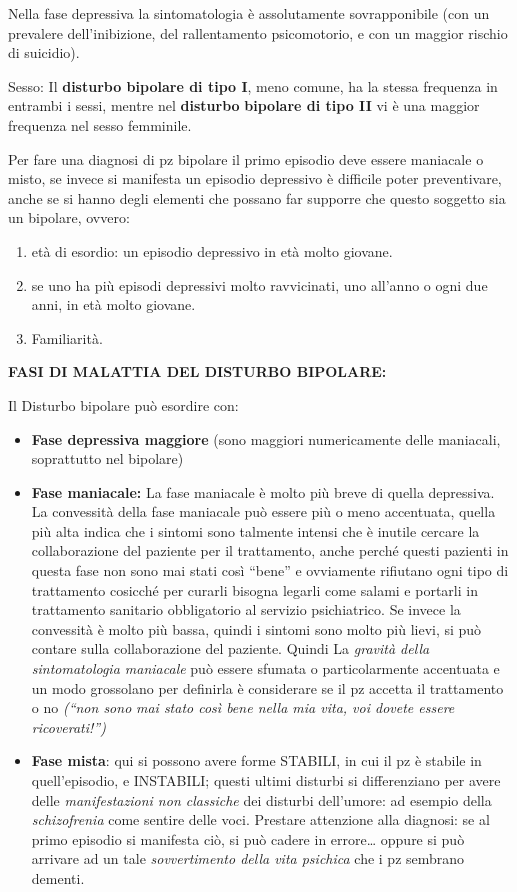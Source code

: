 \documentclass[]{article}
\begin{document}
Nella fase depressiva la sintomatologia è assolutamente sovrapponibile
(con un prevalere dell'inibizione, del rallentamento psicomotorio, e con
un maggior rischio di suicidio).

Sesso: Il \textbf{disturbo bipolare di tipo I}, meno comune, ha la
stessa frequenza in entrambi i sessi, mentre nel \textbf{disturbo}
\textbf{bipolare di tipo II} vi è una maggior frequenza nel sesso
femminile.

Per fare una diagnosi di pz bipolare il primo episodio deve essere
maniacale o misto, se invece si manifesta un episodio depressivo è
difficile poter preventivare, anche se si hanno degli elementi che
possano far supporre che questo soggetto sia un bipolare, ovvero:

\begin{enumerate}
\def\labelenumi{\arabic{enumi}.}
\item
  età di esordio: un episodio depressivo in età molto giovane.
\item
  se uno ha più episodi depressivi molto ravvicinati, uno all'anno o
  ogni due anni, in età molto giovane.
\item
  Familiarità.
\end{enumerate}

\textbf{FASI DI MALATTIA DEL DISTURBO BIPOLARE:}

Il Disturbo bipolare può esordire con:

\begin{itemize}
\item
  \textbf{Fase depressiva maggiore} (sono maggiori numericamente delle
  maniacali, soprattutto nel bipolare)
\item
  \textbf{Fase maniacale:} La fase maniacale è molto più breve di quella
  depressiva. La convessità della fase maniacale può essere più o meno
  accentuata, quella più alta indica che i sintomi sono talmente intensi
  che è inutile cercare la collaborazione del paziente per il
  trattamento, anche perché questi pazienti in questa fase non sono mai
  stati così ``bene'' e ovviamente rifiutano ogni tipo di trattamento
  cosicché per curarli bisogna legarli come salami e portarli in
  trattamento sanitario obbligatorio al servizio psichiatrico. Se invece
  la convessità è molto più bassa, quindi i sintomi sono molto più
  lievi, si può contare sulla collaborazione del paziente. Quindi La
  \emph{gravità della sintomatologia maniacale} può essere sfumata o
  particolarmente accentuata e un modo grossolano per definirla è
  considerare se il pz accetta il trattamento o no \emph{(``non sono}
  \emph{mai stato così bene nella mia vita, voi dovete essere
  ricoverati!'')}
\item
  \textbf{Fase mista}: qui si possono avere forme STABILI, in cui il pz
  è stabile in quell'episodio, e INSTABILI; questi ultimi disturbi si
  differenziano per avere delle \emph{manifestazioni non classiche} dei
  disturbi dell'umore: ad esempio della \emph{schizofrenia} come sentire
  delle voci. Prestare attenzione alla diagnosi: se al primo episodio si
  manifesta ciò, si può cadere in errore\ldots{} oppure si può arrivare
  ad un tale \emph{sovvertimento della vita psichica} che i pz sembrano
  dementi.
\end{itemize}
\end{document}
